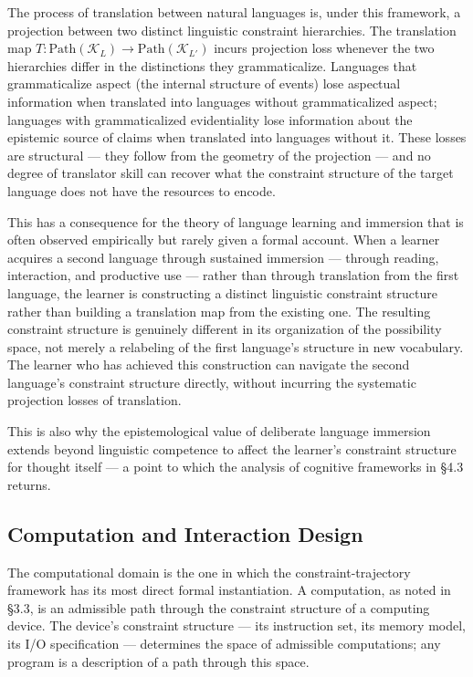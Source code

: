 \documentclass[12pt, twoside]{article}
\theoremstyle{plain}
\theoremstyle{definition}
\theoremstyle{remark}
\begin{document}
The process of translation between natural languages is, under this
framework, a projection between two distinct linguistic constraint
hierarchies.
The translation map $T: \mathrm{Path}(\mathcal{K}_L) \to \mathrm{Path}(\mathcal{K}_{L'})$
incurs projection loss whenever the two hierarchies differ in the
distinctions they grammaticalize.
Languages that grammaticalize aspect (the internal structure of events)
lose aspectual information when translated into languages without
grammaticalized aspect; languages with grammaticalized evidentiality
lose information about the epistemic source of claims when translated
into languages without it.
These losses are structural — they follow from the geometry of the
projection — and no degree of translator skill can recover
what the constraint structure of the target language does not
have the resources to encode.

This has a consequence for the theory of language learning and
immersion that is often observed empirically but rarely given
a formal account.
When a learner acquires a second language through sustained immersion —
through reading, interaction, and productive use — rather than through
translation from the first language, the learner is constructing
a distinct linguistic constraint structure rather than building a
translation map from the existing one.
The resulting constraint structure is genuinely different in its
organization of the possibility space, not merely a relabeling of
the first language's structure in new vocabulary.
The learner who has achieved this construction can navigate
the second language's constraint structure directly,
without incurring the systematic projection losses of translation.

This is also why the epistemological value of deliberate language
immersion extends beyond linguistic competence to affect
the learner's constraint structure for thought itself —
a point to which the analysis of cognitive frameworks in §4.3 returns.

\subsection{Computation and Interaction Design}

The computational domain is the one in which the constraint-trajectory
framework has its most direct formal instantiation.
A computation, as noted in §3.3, is an admissible path through the
constraint structure of a computing device.
The device's constraint structure — its instruction set, its memory
model, its I/O specification — determines the space of admissible
computations; any program is a description of a path through this space.
\end{document}
